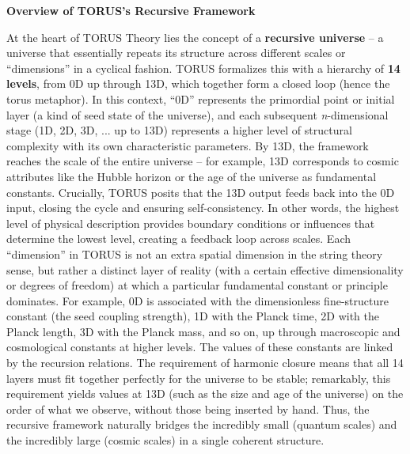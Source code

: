 \documentclass[
]{article}
\begin{document}
\textbf{Overview of TORUS's Recursive Framework}

At the heart of TORUS Theory lies the concept of a \textbf{recursive
universe} -- a universe that essentially repeats its structure across
different scales or ``dimensions'' in a cyclical fashion. TORUS
formalizes this with a hierarchy of \textbf{14 levels}, from 0D up
through 13D, which together form a closed loop (hence the torus
metaphor). In this context, ``0D'' represents the primordial point or
initial layer (a kind of seed state of the universe), and each
subsequent \emph{n}-dimensional stage (1D, 2D, 3D, ... up to 13D)
represents a higher level of structural complexity with its own
characteristic parameters. By 13D, the framework reaches the scale of
the entire universe -- for example, 13D corresponds to cosmic attributes
like the Hubble horizon or the age of the universe as fundamental
constants. Crucially, TORUS posits that the 13D output feeds back into
the 0D input, closing the cycle and ensuring self-consistency. In other
words, the highest level of physical description provides boundary
conditions or influences that determine the lowest level, creating a
feedback loop across scales. Each ``dimension'' in TORUS is not an extra
spatial dimension in the string theory sense, but rather a distinct
layer of reality (with a certain effective dimensionality or degrees of
freedom) at which a particular fundamental constant or principle
dominates. For example, 0D is associated with the dimensionless
fine-structure constant \alpha (the seed coupling strength), 1D with the
Planck time, 2D with the Planck length, 3D with the Planck mass, and so
on, up through macroscopic and cosmological constants at higher levels.
The values of these constants are linked by the recursion relations. The
requirement of harmonic closure means that all 14 layers must fit
together perfectly for the universe to be stable; remarkably, this
requirement yields values at 13D (such as the size and age of the
universe) on the order of what we observe, without those being inserted
by hand. Thus, the recursive framework naturally bridges the incredibly
small (quantum scales) and the incredibly large (cosmic scales) in a
single coherent structure.
\end{document}
